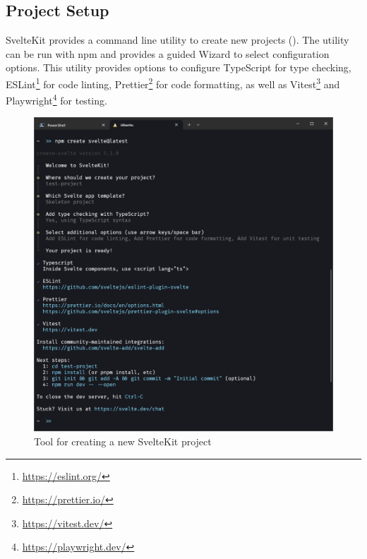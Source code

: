 \subsection{Project Setup}
SvelteKit provides a command line utility to create new projects (). The utility can be run with npm and provides a guided Wizard to select configuration options. This utility provides options to configure TypeScript for type checking, ESLint\footnote{\url{https://eslint.org/}} for code linting, Prettier\footnote{\url{https://prettier.io/}} for code formatting, as well as Vitest\footnote{\url{https://vitest.dev/}} and Playwright\footnote{\url{https://playwright.dev/}} for testing. 


\begin{figure}
    \centering
    \includegraphics[width=.95\linewidth,trim={0 15cm 0 1.5cm},clip]{assets/sveltekit-project-setup}
    \caption{Tool for creating a new SvelteKit project}
    \label{fig:project-setup}
\end{figure}

